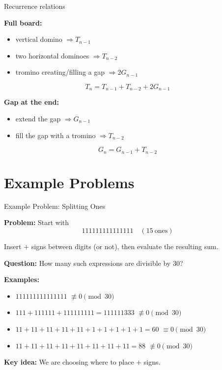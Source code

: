 \begin{frame}{Recurrence relations}

\textbf{Full board:}

\begin{itemize}
    \item vertical domino \(\Rightarrow T_{n-1}\)
    \item two horizontal dominoes \(\Rightarrow T_{n-2}\)
    \item tromino creating/filling a gap \(\Rightarrow 2G_{n-1}\)
\end{itemize}

\[
T_n = T_{n-1} + T_{n-2} + 2G_{n-1}
\]

\medskip

\textbf{Gap at the end:}

\begin{itemize}
    \item extend the gap \(\Rightarrow G_{n-1}\)
    \item fill the gap with a tromino \(\Rightarrow T_{n-2}\)
\end{itemize}

\[
G_n = G_{n-1} + T_{n-2}
\]

\end{frame}


\section{Example Problems}
\begin{frame}{Example Problem: Splitting Ones}

\textbf{Problem:}
Start with
\[
111111111111111 \quad (15\ \text{ones})
\]

Insert $+$ signs between digits (or not), then evaluate the resulting sum.

\medskip

\textcolor{sqt-question}{
\textbf{Question:} How many such expressions are divisible by $30$?
}

\medskip

\textbf{Examples:}
\begin{itemize}
    \item $111111111111111$ \hfill $\not\equiv 0 \pmod{30}$
    \item $111 + 111111 + 111111111 = 111111333$ \hfill $\not\equiv 0 \pmod{30}$
    \item $11 + 11 + 11 + 11 + 11 + 1 + 1 + 1 + 1 + 1 = 60$ \hfill $\equiv 0 \pmod{30}$
    \item $11 + 11 + 11 + 11 + 11 + 11 + 11 + 11 = 88$ \hfill $\not\equiv 0 \pmod{30}$
\end{itemize}

\medskip

\textbf{Key idea:} We are choosing where to place $+$ signs.

\end{frame}





